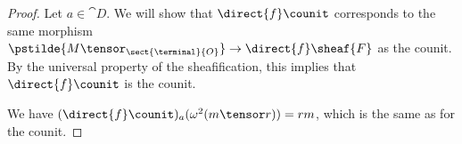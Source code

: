 \begin{proof}
Let $a\in\cat{D}$.
We will show that $\direct{f}\counit$ corresponds to the same
morphism $\pstilde{M\tensor_{\sect{\terminal}{O}}} \rightarrow \direct{f}\sheaf{F}$
as the counit. By the universal property of  the sheafification, this implies that $\direct{f}\counit$ is the counit.

We have
$(\direct{f}\counit)_a (\omega^2(m\tensor r)) = rm$, which is the same as for the counit.
\end{proof}